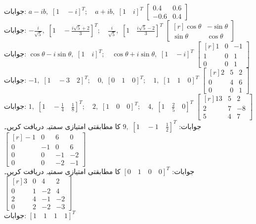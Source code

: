 جوابات:
$a-ib,\,\,[1 \quad -i]^T; \quad  a+ib,\,\, [1\quad i]^T $
\quad 
$\begin{bmatrix} 0.4&0.6\\-0.6&0.4  \end{bmatrix}$\\
جوابات:
$-\tfrac{i}{\sqrt{5}},\,\,[1 \quad -\tfrac{i\sqrt{5}+2}{3}]^T; \quad  \tfrac{i}{\sqrt{5}},\,\, [1 \quad \tfrac{i\sqrt{5}-2}{3}]^T $
\quad 
$\begin{bmatrix*}[r] \cos \theta&-\sin \theta\\\sin \theta&\cos \theta  \end{bmatrix*}$\\
جوابات:
$\cos \theta-i\sin \theta,\,\,[1 \quad i]^T; \quad  \cos \theta+i\sin \theta,\,\, [1 \quad -i]^T $
\quad 
$\begin{bmatrix*}[r]1&0&-1\\1&0&1\\0&0&1  \end{bmatrix*}$\\
جوابات:
$-1,\,\,[1 \quad -3 \quad 2]^T; \quad  0,\,\, [0\quad 1\quad 0]^T ; \quad  1,\,\, [1 \quad 1\quad 0]^T$
\quad 
$\begin{bmatrix*}[r]2&5&2\\0&4&6\\0&0&1  \end{bmatrix*}$\\
جوابات:
$1,\,\,[1 \quad -\tfrac{1}{4} \quad \tfrac{1}{8}]^T; \quad  2,\,\, [1\quad 0\quad 0]^T ; \quad  4,\,\, [1 \quad \tfrac{2}{5}\quad 0]^T$
\quad 
$\begin{bmatrix*}[r]13&5&2\\2&7&-8\\5&4&7  \end{bmatrix*}$\\
جوابات:
$9,\,\,[1 \quad -1 \quad \tfrac{1}{2}]^T$
\quad {} کا مطابقتی امتیازی سمتیہ دریافت کریں۔ 
$\begin{bmatrix*}[r]-1&0&6&0\\0&-1&0&6\\0&0&-1&-2\\0&0&-2&-1  \end{bmatrix*} $\\
جوابات:
$[0 \quad 1\quad 0\quad 0]^T$
\quad {} کا مطابقتی امتیازی سمتیہ دریافت کریں۔ 
$\begin{bmatrix*}[r]3&0&4&2\\0&1&-2&4\\2&4&-1&-2\\0&2&-2&-3  \end{bmatrix*} $\\
جوابات:
$[1 \quad 1\quad 1\quad 1]^T$

